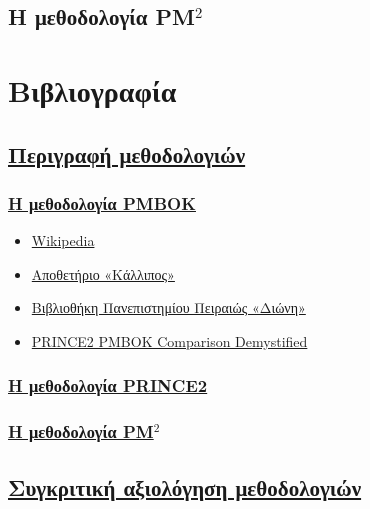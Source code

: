 \documentclass[12pt]{turabian-researchpaper}
\begin{document}
\subsection{Η μεθοδολογία PM\texorpdfstring{$^2$}{}}\label{comparison_pm2}

\newpage\section{Βιβλιογραφία}
\subsection{\texorpdfstring{\hyperref[methods]{Περιγραφή μεθοδολογιών}}{}}
\subsubsection{\texorpdfstring{\hyperref[method_pmbok]{Η μεθοδολογία PMBOK}}{}}

\begin{itemize}
    \item \href{https://en.wikipedia.org/wiki/Project_Management_Body_of_Knowledge}{Wikipedia}
    \item \href{https://repository.kallipos.gr/bitstream/11419/2262/3/06_kefalaio6.pdf}{Αποθετήριο «Κάλλιπος»}
    \item \href{https://dione.lib.unipi.gr/xmlui/bitstream/handle/unipi/8488/Fragkos_Georgios.pdf}{Βιβλιοθήκη Πανεπιστημίου Πειραιώς «Διώνη»}
    \item \href{https://www.slideshare.net/CTESolutions/prince2-pmbok-comparison-demystified-29846454}{PRINCE2 PMBOK Comparison Demystified}
\end{itemize}

\subsubsection{\texorpdfstring{\hyperref[method_prince2]{Η μεθοδολογία PRINCE2}}{}}

\subsubsection{\texorpdfstring{\hyperref[method_pm2]{Η μεθοδολογία PM$^2$}}{}}

\subsection{\texorpdfstring{\hyperref[comparisons]{Συγκριτική αξιολόγηση μεθοδολογιών}}{}}
\end{document}
